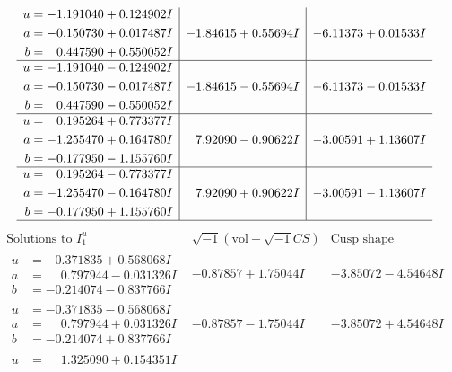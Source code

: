 \documentclass[1p]{elsarticle_modified}
\theoremstyle{definition}
\newcommand{\I}{\sqrt{-1}}
\begin{document}
$$\begin{array}{c|c|c}
\begin{aligned}
u &= -1.191040 + 0.124902 I \\
a &= -0.150730 + 0.017487 I \\
b &= \phantom{-}0.447590 + 0.550052 I\end{aligned}
 & -1.84615 + 0.55694 I & -6.11373 + 0.01533 I \\ \hline\begin{aligned}
u &= -1.191040 - 0.124902 I \\
a &= -0.150730 - 0.017487 I \\
b &= \phantom{-}0.447590 - 0.550052 I\end{aligned}
 & -1.84615 - 0.55694 I & -6.11373 - 0.01533 I \\ \hline\begin{aligned}
u &= \phantom{-}0.195264 + 0.773377 I \\
a &= -1.255470 + 0.164780 I \\
b &= -0.177950 - 1.155760 I\end{aligned}
 & \phantom{-}7.92090 - 0.90622 I & -3.00591 + 1.13607 I \\ \hline\begin{aligned}
u &= \phantom{-}0.195264 - 0.773377 I \\
a &= -1.255470 - 0.164780 I \\
b &= -0.177950 + 1.155760 I\end{aligned}
 & \phantom{-}7.92090 + 0.90622 I & -3.00591 - 1.13607 I\\
 \hline 
 \end{array}$$\newpage$$\begin{array}{c|c|c}  
\text{Solutions to }I^u_{1}& \I (\text{vol} + \sqrt{-1}CS) & \text{Cusp shape}\\
 \hline 
\begin{aligned}
u &= -0.371835 + 0.568068 I \\
a &= \phantom{-}0.797944 - 0.031326 I \\
b &= -0.214074 - 0.837766 I\end{aligned}
 & -0.87857 + 1.75044 I & -3.85072 - 4.54648 I \\ \hline\begin{aligned}
u &= -0.371835 - 0.568068 I \\
a &= \phantom{-}0.797944 + 0.031326 I \\
b &= -0.214074 + 0.837766 I\end{aligned}
 & -0.87857 - 1.75044 I & -3.85072 + 4.54648 I \\ \hline\begin{aligned}
u &= \phantom{-}1.325090 + 0.154351 I \\

\end{aligned}
\end{array}$$
\end{document}
